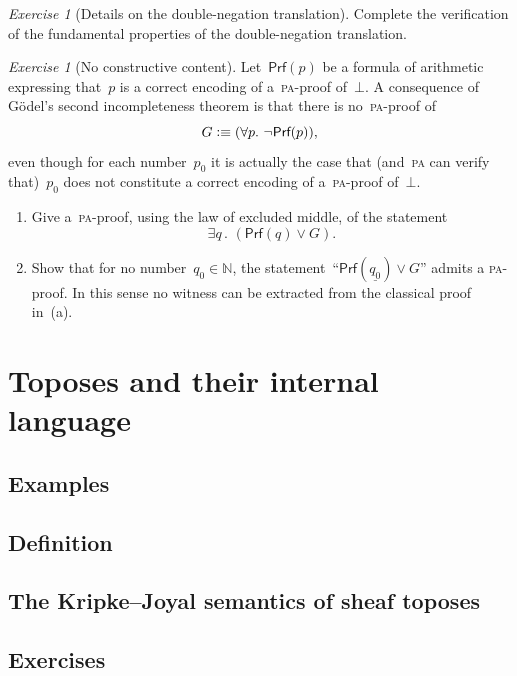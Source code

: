 \documentclass[10pt,reqno,a4paper,openany]{amsbook}
\theoremstyle{definition}
\theoremstyle{plain}
\theoremstyle{remark}
\newcommand{\NN}{\mathbb{N}}
\newcommand{\?}{\,{:}\,}
\renewcommand{\_}{\mathpunct{.}\,}
\newcommand{\defequiv}{\vcentcolon\equiv}
\newtheorem{exercise}[defn]{Exercise}
\begin{document}
\begin{exercise}[Details on the double-negation translation]
Complete the verification of the fundamental properties of the double-negation
translation.
\end{exercise}

\begin{exercise}[No constructive content]\label{ex:no-constructive-content}
Let~$\textsf{Prf}(p)$ be a formula of arithmetic expressing that~$p$ is a
correct encoding of a~\textsc{pa}-proof of~$\bot$. A consequence of Gödel's
second incompleteness theorem is that there is no~\textsc{pa}-proof of
\[ G \defequiv (\forall p\_ \neg\textsf{Prf}(p)), \]
even though for each number~$p_0$ it is actually the case that (and~\textsc{pa}
can verify that)~$p_0$ does not constitute a correct encoding of
a~\textsc{pa}-proof of~$\bot$.
\begin{enumerate}
\item Give a~\textsc{pa}-proof, using the law of excluded middle, of the
statement
\[ \exists q\_ (\textsf{Prf}(q) \vee G). \]
\item Show that for no number~$q_0 \in \NN$, the
statement~``$\textsf{Prf}(\underline{q_0})
\vee G$'' admits a \textsc{pa}-proof. In this sense no witness can be
extracted from the classical proof in~(a).
\end{enumerate}
\end{exercise}


\chapter{Toposes and their internal language}

\section{Examples}
\newpage

\section{Definition}
\newpage

\section{The Kripke--Joyal semantics of sheaf toposes}
\newpage

\section{Exercises}
\end{document}
